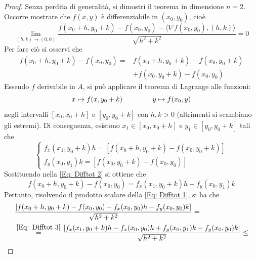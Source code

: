     \begin{proof}
        Senza perdita di generalità, si dimostri il teorema in dimensione $n=2$. Occorre mostrare che $f(x,y)$ è differenziabile in $(x_0, y_0)$, cioè
        \begin{equation} \label{Eq: Difftot 1}
            \lim_{(h,k) \to (0,0)} \frac{f(x_0+h, y_0+k)-f(x_0, y_0)-\langle\nabla f(x_0, y_0), (h,k)\rangle}{\sqrt{h^2+k^2}}=0
        \end{equation}
        Per fare ciò si osservi che
        \begin{equation} \label{Eq: Difftot 2}
            \begin{aligned}
                f(x_0+h, y_0+k)-f(x_0, y_0)=&f(x_0+h, y_0+k)-f(x_0, y_0+k)\\&+f(x_0, y_0+k)-f(x_0, y_0)
            \end{aligned}
        \end{equation}
        Essendo $f$ derivabile in $A$, si può applicare il teorema di Lagrange alle funzioni:
        \begin{equation*}
            x \mapsto f(x, y_0+k) \hspace{1.5cm} y \mapsto f(x_0, y)
        \end{equation*}
        negli intervalli $[x_0, x_0+h]$ e $[y_0, y_0+k]$ con $h,k>0$ (altrimenti si scambiano gli estremi).
        Di conseguenza, esistono $x_1 \in [x_0, x_0+h] $ e $y_1 \in [y_0, y_0+k]$ tali che
        \begin{equation*}
            \begin{cases}
                f_x(x_1, y_0+k)h=\left[f(x_0+h, y_0+k)-f(x_0, y_0+k)\right]\\
                f_y(x_0, y_1)k=\left[f(x_0, y_0+k)-f(x_0, y_0) \right]
            \end{cases}
        \end{equation*}
        Sostituendo nella \eqref{Eq: Difftot 2} si ottiene che
        \begin{equation} \label{Eq: Difftot 3}
            f(x_0+h, y_0+k)-f(x_0, y_0)=f_x(x_1, y_0+k)h+f_y(x_0, y_1)k
        \end{equation}
        Pertanto, risolvendo il prodotto scalare della \eqref{Eq: Difftot 1}, si ha che
        \begin{equation*}
            \begin{aligned}
                &\frac{|f(x_0+h, y_0+k)-f(x_0, y_0)-f_x(x_0, y_0)h-f_y(x_0, y_0)k|}{\sqrt{h^2+k^2}}=\\
                &\overset{\eqref{Eq: Difftot 3}}{=}\frac{|f_x(x_1, y_0+k)h-f_x(x_0, y_0)h+f_y(x_0, y_1)k-f_y(x_0, y_0)k|}{\sqrt{h^2+k^2}}\leq\\

\end{aligned}
\end{equation*}
\end{proof}
